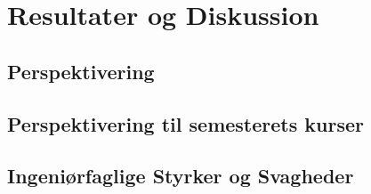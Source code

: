 \chapter{Resultater og Diskussion}

\section{Perspektivering}

\section{Perspektivering til semesterets kurser}

\section{Ingeniørfaglige Styrker og Svagheder}